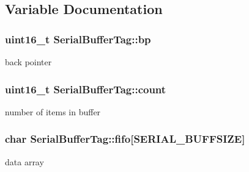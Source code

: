 \subsection{Variable Documentation}
\hypertarget{group___serial_g80fec57b0c1089e49be601c8e154011f}{
\subsubsection[{bp}]{\setlength{\rightskip}{0pt plus 5cm}uint16\_\-t {\bf SerialBufferTag::bp}}}
\label{group___serial_g80fec57b0c1089e49be601c8e154011f}


back pointer \hypertarget{group___serial_gf764ad82a3af5651722c23326f28adbd}{
\subsubsection[{count}]{\setlength{\rightskip}{0pt plus 5cm}uint16\_\-t {\bf SerialBufferTag::count}}}
\label{group___serial_gf764ad82a3af5651722c23326f28adbd}


number of items in buffer \hypertarget{group___serial_g0cbebf4bc14ed97a7d673795fccb8f26}{
\subsubsection[{fifo}]{\setlength{\rightskip}{0pt plus 5cm}char {\bf SerialBufferTag::fifo}\mbox{[}SERIAL\_\-BUFFSIZE\mbox{]}}}
\label{group___serial_g0cbebf4bc14ed97a7d673795fccb8f26}


data array 